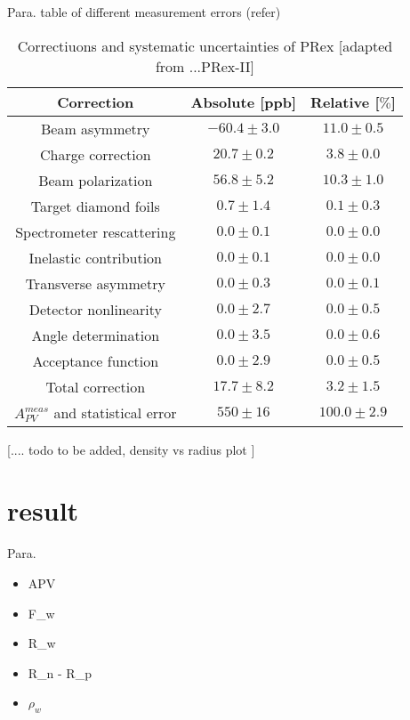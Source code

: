 Para. table of different measurement errors (refer)

\begin{table}[]
    \centering
    \begin{tabular}{c c c} \\ 
    \hline
         Correction     & Absolute [ppb] & Relative [$\%$]  \\ \hline
         Beam asymmetry & $-60.4 \pm 3.0$ & $11.0 \pm 0.5$ \\ 
         Charge correction & $20.7 \pm 0.2$ & $3.8 \pm 0.0$ \\
         Beam polarization & $56.8 \pm 5.2$ & $10.3 \pm 1.0$ \\
         Target diamond foils & $0.7 \pm 1.4$ & $0.1 \pm 0.3$ \\
         Spectrometer rescattering & $0.0 \pm 0.1$ & $0.0 \pm 0.0$ \\
         Inelastic contribution & $0.0 \pm 0.1$ & $0.0 \pm 0.0$ \\
         Transverse asymmetry & $0.0 \pm 0.3$ & $0.0 \pm 0.1$ \\
         Detector nonlinearity & $0.0 \pm 2.7$ & $0.0 \pm 0.5$ \\
         Angle determination & $0.0 \pm 3.5$ & $0.0 \pm 0.6$ \\
         Acceptance function & $ 0.0 \pm 2.9$ & $0.0 \pm 0.5$ \\
         Total correction & $17.7 \pm 8.2$ & $3.2 \pm 1.5$ \\
         $A_{PV}^{meas}$ and statistical error & $550 \pm 16$ & $100.0 \pm 2.9$ \\ \hline
    \end{tabular}
    \caption{Correctiuons and systematic uncertainties of PRex [adapted from ...PRex-II]}
    \label{tab:my_label}
\end{table}

[.... todo to be added, density vs radius plot ]

\section{result}

Para.
\begin{itemize}
    \item APV
    \item F_w
    \item R_w
    \item R_n - R_p
    \item $\rho_w$
\end{itemize}



